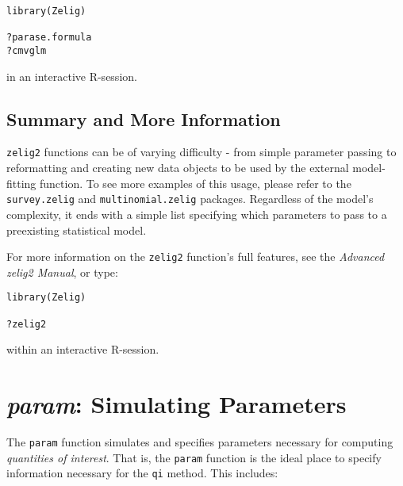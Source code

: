 \documentclass{article}
\newcommand{\code}[1]{{\tt #1}}
\begin{document}
\begin{verbatim}
library(Zelig)

?parase.formula
?cmvglm
\end{verbatim}

in an interactive R-session.


\subsection{Summary and More Information}

\code{zelig2} functions can be of varying difficulty - from simple parameter passing to reformatting and creating new data objects to be used by the external model-fitting function. To see more examples of this usage, please refer to the \code{survey.zelig} and \code{multinomial.zelig} packages. Regardless of the model's complexity, it ends with a simple list specifying which parameters to pass to a preexisting statistical model.

For more information on the \code{zelig2} function's full features, see
the \emph{Advanced zelig2 Manual}, or type:

\begin{verbatim}
library(Zelig)

?zelig2
\end{verbatim}

within an interactive R-session.



\section{\emph{param}: Simulating Parameters}\label{section:param}


The \code{param} function simulates and specifies parameters necessary for computing
\emph{quantities of interest}. That is, the \code{param} function is the ideal place
to specify information necessary for the \code{qi} method. This includes:
\end{document}
